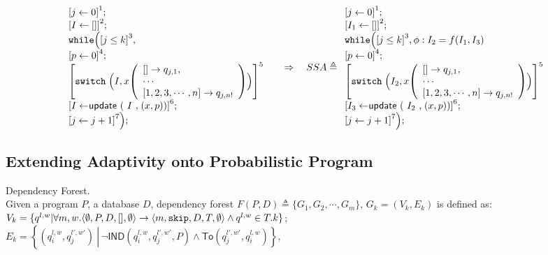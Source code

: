 \documentclass[a4paper,11pt]{article}
\begin{document}
\[
\begin{array}{l}
     \left[j \leftarrow 0 \right]^1 ; \\
    \left[I \leftarrow [] \right]^2; \\
    \ewhile \Big( 
    \left[j \leq k \right]^3 , \\
    \left[p \leftarrow 0 \right]^4 ; \\
    \left[
    \eswitch \Big( I, x
    \left(\begin{array}{l}
        [ ] \to q_{j,1},\\
        \cdots\\
    \clabel{1, 2, 3, \cdots, n} \to q_{j,n!}
    \end{array}\right)
    \Big)
    \right]^5\\
    \clabel{I \leftarrow \eupdt(I, (x, p))}^6;\\
    \clabel{j \leftarrow j + 1 }^7
    \Big) ;
\end{array}
%
~~~~ \Rightarrow ~~~
%
SSA \triangleq
\begin{array}{l}
     \left[j \leftarrow 0 \right]^1 ; \\
    \left[I_1 \leftarrow [] \right]^2; \\
    \ewhile \Big( 
    \left[j \leq k \right]^3 , \phi: {I_2} = f({I_1}, {I_3}) \\
    \left[p \leftarrow 0 \right]^4 ; \\
    \left[
    \eswitch \Big( {I_2}, x
    \left(\begin{array}{l}
        [ ] \to q_{j,1},\\
        \cdots\\
    \clabel{1, 2, 3, \cdots, n} \to q_{j,n!}
    \end{array}\right)
    \Big)
    \right]^5\\
    \clabel{{I_3} \leftarrow \eupdt({I_2}, (x, p))}^6;\\
    \clabel{j \leftarrow j + 1 }^7
    \Big) ;
\end{array}
\]
%
%
\subsection{Extending Adaptivity onto Probabilistic Program}
%
\begin{defn}
Dependency Forest.
\\
Given a program $P$, a database $D$, 
dependency forest $F(P, D) \triangleq \{ G_1, G_2, \cdots, G_m \}$,
$G_k = (V_k, E_k)$ is defined as: 
\\
$V_k =\{q^{l,w} |\forall m, w. \langle \emptyset, P, D,[], \emptyset  \rangle \rightarrow \langle m, \mathtt{skip}, D, T, \emptyset \rangle \land q^{l,w} \in T.k  \}$;
\\
$E_k = \left\{(q_i^{l,w},q_j^{l',w'}) 
~ \left \vert ~ \neg \mathsf{IND}(q_i^{l,w},q_j^{l',w'}, P)
\land \mathsf{To}(q_j^{l',w'}, q_i^{l,w}) \right.\right\}$,
\end{defn}
\end{document}

